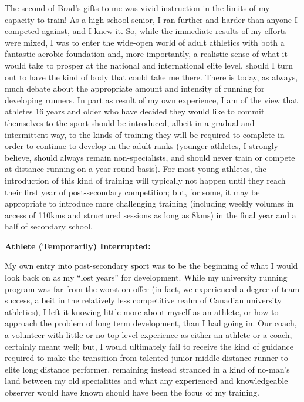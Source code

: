 The second of Brad’s gifts to me was vivid instruction in the limits of my capacity to train! As a high school senior, I ran further and harder than anyone I competed against, and I knew it. So, while the immediate results of my efforts were mixed, I was to enter the wide-open world of adult athletics with both a fantastic aerobic foundation and, more importantly, a realistic sense of what it would take to prosper at the national and international elite level, should I turn out to have the kind of body that could take me there. There is today, as always, much debate about the appropriate amount and intensity of running for developing runners. In part as result of my own experience, I am of the view that athletes 16 years and older who have decided they would like to commit themselves to the sport should be introduced, albeit in a gradual and intermittent way, to the kinds of training they will be required to complete in order to continue to develop in the adult ranks (younger athletes, I strongly believe, should always remain non-specialists, and should never train or compete at distance running on a year-round basis). For most young athletes, the introduction of this kind of training will typically not happen until they reach their first year of post-secondary competition; but, for some, it may be appropriate to introduce more challenging training (including weekly volumes in access of 110kms and structured sessions as long as 8kms) in the final year and a half of secondary school.



\bigskip
\textbf{Athlete (Temporarily) Interrupted:}
\bigskip

My own entry into post-secondary sport was to be the beginning of what I would look back on as my “lost years” for development. While my university running program was far from the worst on offer (in fact, we experienced a degree of team success, albeit in the relatively less competitive realm of Canadian university athletics), I left it knowing little more about myself as an athlete, or how to approach the problem of long term development, than I had going in. Our coach, a volunteer with little or no top level experience as either an athlete or a coach, certainly meant well; but, I would ultimately fail to receive the kind of guidance required to make the transition from talented junior middle distance runner to elite long distance performer, remaining instead stranded in a kind of no-man’s land between my old specialities and what any experienced and knowledgeable observer would have known should have been the focus of my training.


